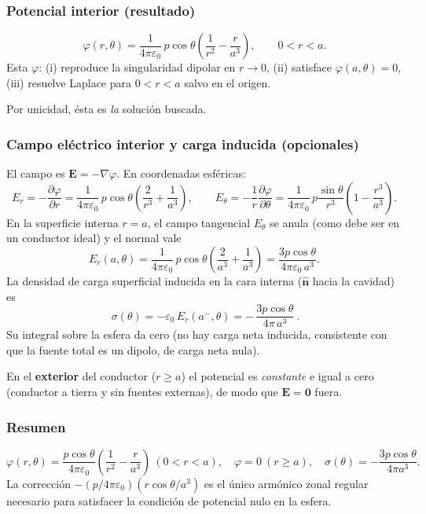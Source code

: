 \documentclass{article}
\begin{document}
\subsubsection*{Potencial interior (resultado)}
\[
\boxed{\;
\varphi(r,\theta)=\frac{1}{4\pi\varepsilon_0}\,p\cos\theta\left(\frac{1}{r^{2}}-\frac{r}{a^{3}}\right),
\qquad 0<r<a.\
}
\]
Esta $\varphi$:
(i) reproduce la singularidad dipolar en $r\to 0$,
(ii) satisface $\varphi(a,\theta)=0$,
(iii) resuelve Laplace para $0<r<a$ salvo en el origen.

Por unicidad, ésta es \emph{la} solución buscada.

\subsubsection*{Campo eléctrico interior y carga inducida (opcionales)}
El campo es $\mathbf E=-\nabla\varphi$. En coordenadas esféricas:
\[
E_r=-\frac{\partial\varphi}{\partial r}
=\frac{1}{4\pi\varepsilon_0}\,p\cos\theta\left(\frac{2}{r^{3}}+\frac{1}{a^{3}}\right),\qquad
E_\theta=-\frac{1}{r}\frac{\partial\varphi}{\partial\theta}
=\frac{1}{4\pi\varepsilon_0}\,p\frac{\sin\theta}{r^{3}}\left(1-\frac{r^{3}}{a^{3}}\right).
\]
En la superficie interna $r=a$, el campo tangencial $E_\theta$ se anula (como debe ser en un conductor ideal) y el normal vale
\[
E_r(a,\theta)=\frac{1}{4\pi\varepsilon_0}\,p\cos\theta\left(\frac{2}{a^{3}}+\frac{1}{a^{3}}\right)
=\frac{3p\cos\theta}{4\pi\varepsilon_0\,a^{3}}.
\]
La densidad de carga superficial inducida en la cara interna ($\hat{\mathbf n}$ hacia la cavidad) es
\[
\boxed{\ \sigma(\theta)=-\varepsilon_0\,E_r(a^-,\theta)= -\,\frac{3p\cos\theta}{4\pi\,a^{3}}\ }.
\]
Su integral sobre la esfera da cero (no hay carga neta inducida, consistente con que la fuente total es un dipolo, de carga neta nula).

En el \textbf{exterior} del conductor ($r\ge a$) el potencial es \emph{constante} e igual a cero (conductor a tierra y sin fuentes externas), de modo que $\mathbf E=\mathbf 0$ fuera.

\subsubsection*{Resumen}
\[
\boxed{
\varphi(r,\theta)=\frac{p\cos\theta}{4\pi\varepsilon_0}\left(\frac{1}{r^{2}}-\frac{r}{a^{3}}\right)\ (0<r<a),\quad
\varphi=0\ (r\ge a),\quad
\sigma(\theta)=-\dfrac{3p\cos\theta}{4\pi a^{3}}.
}
\]
La corrección $-(p/4\pi\varepsilon_0)(r\cos\theta/a^{3})$ es el único armónico zonal regular necesario para satisfacer la condición de potencial nulo en la esfera.
\end{document}

